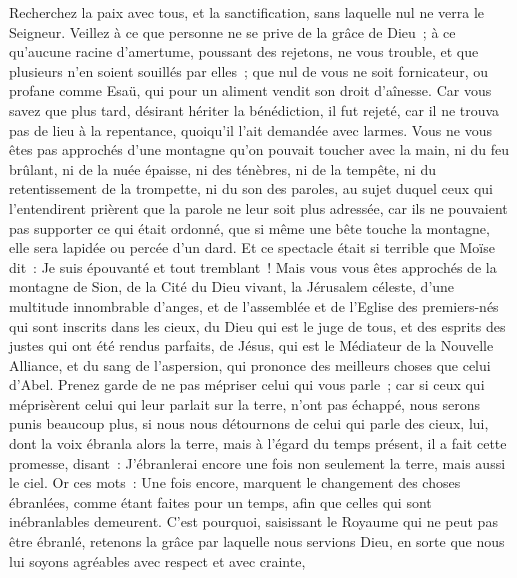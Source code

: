 \begin{multicols}{2}
Recherchez la paix avec tous, et la sanctification, sans laquelle nul ne verra le Seigneur.
Veillez à ce que personne ne se prive de la grâce de Dieu~; à ce qu'aucune racine d'amertume, poussant des rejetons, ne vous trouble, et que plusieurs n'en soient souillés par elles~;
que nul de vous ne soit fornicateur, ou profane comme Esaü, qui pour un aliment vendit son droit d'aînesse.
Car vous savez que plus tard, désirant hériter la bénédiction, il fut rejeté, car il ne trouva pas de lieu à la repentance, quoiqu'il l'ait demandée avec larmes.
Vous ne vous êtes pas approchés d'une montagne qu'on pouvait toucher avec la main, ni du feu brûlant, ni de la nuée épaisse, ni des ténèbres, ni de la tempête,
ni du retentissement de la trompette, ni du son des paroles, au sujet duquel ceux qui l'entendirent prièrent que la parole ne leur soit plus adressée,
car ils ne pouvaient pas supporter ce qui était ordonné, que si même une bête touche la montagne, elle sera lapidée ou percée d'un dard.
Et ce spectacle était si terrible que Moïse dit~: Je suis épouvanté et tout tremblant~!
Mais vous vous êtes approchés de la montagne de Sion, de la Cité du Dieu vivant, la Jérusalem céleste, d'une multitude innombrable d'anges,
et de l'assemblée et de l'Eglise des premiers-nés qui sont inscrits dans les cieux, du Dieu qui est le juge de tous, et des esprits des justes qui ont été rendus parfaits,
de Jésus, qui est le Médiateur de la Nouvelle Alliance, et du sang de l'aspersion, qui prononce des meilleurs choses que celui d'Abel.
Prenez garde de ne pas mépriser celui qui vous parle~; car si ceux qui méprisèrent celui qui leur parlait sur la terre, n'ont pas échappé, nous serons punis beaucoup plus, si nous nous détournons de celui qui parle des cieux,
lui, dont la voix ébranla alors la terre, mais à l'égard du temps présent, il a fait cette promesse, disant~: J'ébranlerai encore une fois non seulement la terre, mais aussi le ciel.
Or ces mots~: Une fois encore, marquent le changement des choses ébranlées, comme étant faites pour un temps, afin que celles qui sont inébranlables demeurent.
C'est pourquoi, saisissant le Royaume qui ne peut pas être ébranlé, retenons la grâce par laquelle nous servions Dieu, en sorte que nous lui soyons agréables avec respect et avec crainte,

\end{multicols}
